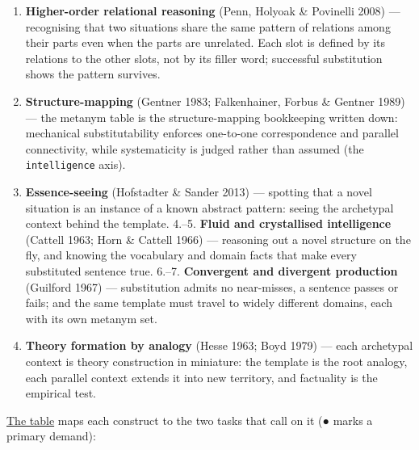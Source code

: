 \begin{enumerate}
\def\labelenumi{\arabic{enumi}.}
\tightlist
\item
  \textbf{Higher-order relational reasoning} (Penn, Holyoak \& Povinelli 2008) --- recognising that two situations share the same pattern of relations among their parts even when the parts are unrelated. Each slot is defined by its relations to the other slots, not by its filler word; successful substitution shows the pattern survives.
\item
  \textbf{Structure-mapping} (Gentner 1983; Falkenhainer, Forbus \& Gentner 1989) --- the metanym table is the structure-mapping bookkeeping written down: mechanical substitutability enforces one-to-one correspondence and parallel connectivity, while systematicity is judged rather than assumed (the \texttt{intelligence} axis).
\item
  \textbf{Essence-seeing} (Hofstadter \& Sander 2013) --- spotting that a novel situation is an instance of a known abstract pattern: seeing the archetypal context behind the template. 4.--5. \textbf{Fluid and crystallised intelligence} (Cattell 1963; Horn \& Cattell 1966) --- reasoning out a novel structure on the fly, and knowing the vocabulary and domain facts that make every substituted sentence true. 6.--7. \textbf{Convergent and divergent production} (Guilford 1967) --- substitution admits no near-misses, a sentence passes or fails; and the same template must travel to widely different domains, each with its own metanym set.
\item
  \textbf{Theory formation by analogy} (Hesse 1963; Boyd 1979) --- each archetypal context is theory construction in miniature: the template is the root analogy, each parallel context extends it into new territory, and factuality is the empirical test.
\end{enumerate}

\hyperref[tab-constructs]{The table} maps each construct to the two tasks that call on it (● marks a primary demand):

\protect{}\label{tab-constructs}{}

